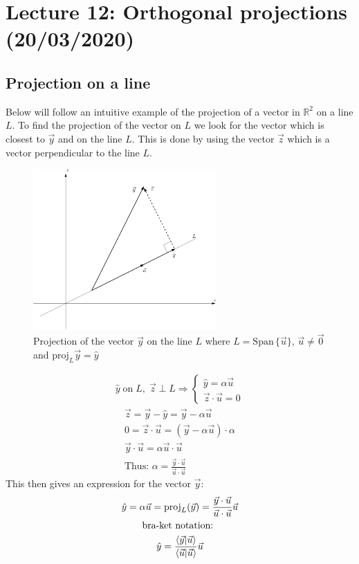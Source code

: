 \documentclass[11pt, a4paper]{article}
\newcommand*{\R}{\ensuremath{\mathbb{R}}}
\begin{document}
\setcounter{section}{11}

\section{Lecture 12: Orthogonal projections (20/03/2020)}

\subsection{Projection on a line}
Below will follow an intuitive example of the projection of a vector in $\R^2$ on a line $L$. To find the projection of the vector on $L$ we look for the vector which is closest to $\vec{y}$ and on the line $L$. This is done by using the vector $\vec{z}$ which is a vector perpendicular to the line $L$.
\begin{figure}[h]
  \centerline{\includegraphics[width=70mm]{images/Projection.png}}
  \caption{Projection of the vector $\vec{y}$ on the line $L$ where $L = \text{Span}\,\{\vec{u}\}$, $\vec{u} \neq \vec{0}$ and $\text{proj}_L{\vec{y}} = \hat{y}$}
\end{figure}
\begin{gather}
  \hat{y} \;\text{on}\; L,\;\vec{z} \perp L \Rightarrow
  \begin{cases}
    \hat{y} = \alpha\vec{u}\\
    \vec{z} \cdot \vec{u} = 0
  \end{cases}
\end{gather}
\begin{gather}
  \vec{z} = \vec{y} - \hat{y} = \vec{y} - \alpha \vec{u}\\
  0 = \vec{z} \cdot \vec{u} = (\vec{y} - \alpha \vec{u}) \cdot \alpha\\
  \vec{y} \cdot \vec{u} = \alpha \vec{u} \cdot \vec{u}\\
  \text{Thus: } \alpha = \frac{\vec{y} \cdot \vec{u}}{\vec{u} \cdot \vec{u}}
\end{gather}
This then gives an expression for the vector $\vec{y}$:
\begin{gather}
  \hat{y} = \alpha \vec{u} = \text{proj}_L(\vec{y}) = \frac{\vec{y} \cdot \vec{u}}{\vec{u} \cdot \vec{u}}\vec{u}\\
  \text{bra-ket notation: } \notag \\
  \hat{y} = \frac{\langle \vec{y} | \vec{u} \rangle}{\langle \vec{u} | \vec{u} \rangle}\vec{u} 
\end{gather}
\end{document}
